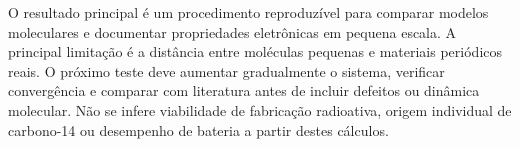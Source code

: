 O resultado principal é um procedimento reproduzível para comparar modelos moleculares e documentar propriedades eletrônicas em pequena escala. A principal limitação é a distância entre moléculas pequenas e materiais periódicos reais. O próximo teste deve aumentar gradualmente o sistema, verificar convergência e comparar com literatura antes de incluir defeitos ou dinâmica molecular. Não se infere viabilidade de fabricação radioativa, origem individual de carbono-14 ou desempenho de bateria a partir destes cálculos.
